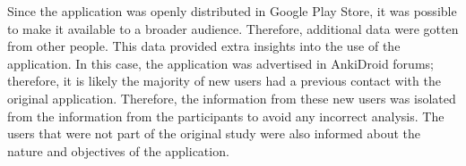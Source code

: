 Since the application was openly distributed in Google Play Store, it was possible to make it available to a broader audience. Therefore, additional data were gotten from other people. This data provided extra insights into the use of the application. In this case, the application was advertised in AnkiDroid forums; therefore, it is likely the majority of new users had a previous contact with the original application. Therefore, the information from these new users was isolated from the information from the participants to avoid any incorrect analysis. The users that were not part of the original study were also informed about the nature and objectives of the application.
